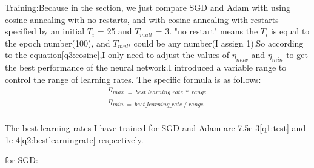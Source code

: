 \documentclass{article}
\begin{document}
Training:Because in the section, we just compare SGD and Adam with using cosine annealing with no restarts, and with cosine annealing with restarts specified by an initial $T_i$ = 25 and $T_{mult}$ = 3.  "no restart" means the $T_i$ is equal to the epoch number(100), and $T_{mult}$ could be any number(I assign 1).So according to the equation\ref{q3:cosine},I only need to adjust the values of $\eta_{max}$  and $\eta_{min}$ to get the best performance of the neural network.I introduced a variable range to control the range of learning rates. The specific formula is as follows:
\begin{equation}
\begin{array}{l}\eta_{max\;=\;best\_learning\_rate\;\ast\;range}\\\eta_{min\;=\;best\_learning\_rate\;/\;range}\\\end{array}
\end{equation}

The best learning rates I have trained for SGD and Adam are 7.5e-3\ref{q1:test} and 1e-4\ref{q2:bestlearningrate} respectively.

for SGD:
\begin{figure}[H]\label{q3:sgdnorestart}
	\centering  %
	\label{Fig.main}
\end{figure}
\end{document}
